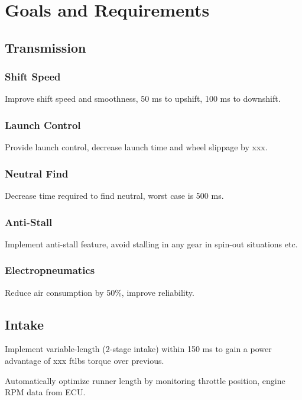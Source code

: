 \chapter{Goals and Requirements}


\section{Transmission}


\subsection{Shift Speed}

Improve shift speed and smoothness, 50 ms to upshift, 100 ms to downshift.


\subsection{Launch Control}

Provide launch control, decrease launch time and wheel slippage by
xxx.


\subsection{Neutral Find}

Decrease time required to find neutral, worst case is 500 ms.


\subsection{Anti-Stall}

Implement anti-stall feature, avoid stalling in any gear in spin-out
situations etc.


\subsection{Electropneumatics}

Reduce air consumption by 50\%, improve reliability. 


\section{Intake}

Implement variable-length (2-stage intake) within 150 ms to gain a
power advantage of xxx ftlbs torque over previous.

Automatically optimize runner length by monitoring throttle position,
engine RPM data from ECU.


